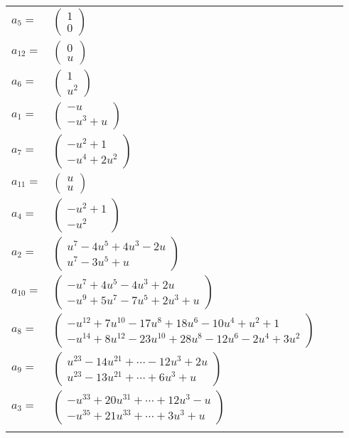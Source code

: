 \documentclass[1p]{elsarticle_modified}
\theoremstyle{definition}
\begin{document}
\begin{tabular}{m{7pt} m{180pt} m{7pt} m{180pt} }
\flushright $a_{5}=$&$\begin{pmatrix}1\\0\end{pmatrix}$ \\
\flushright $a_{12}=$&$\begin{pmatrix}0\\u\end{pmatrix}$ \\
\flushright $a_{6}=$&$\begin{pmatrix}1\\u^2\end{pmatrix}$ \\
\flushright $a_{1}=$&$\begin{pmatrix}- u\\- u^3+u\end{pmatrix}$ \\
\flushright $a_{7}=$&$\begin{pmatrix}- u^2+1\\- u^4+2 u^2\end{pmatrix}$ \\
\flushright $a_{11}=$&$\begin{pmatrix}u\\u\end{pmatrix}$ \\
\flushright $a_{4}=$&$\begin{pmatrix}- u^2+1\\- u^2\end{pmatrix}$ \\
\flushright $a_{2}=$&$\begin{pmatrix}u^7-4 u^5+4 u^3-2 u\\u^7-3 u^5+u\end{pmatrix}$ \\
\flushright $a_{10}=$&$\begin{pmatrix}- u^7+4 u^5-4 u^3+2 u\\- u^9+5 u^7-7 u^5+2 u^3+u\end{pmatrix}$ \\
\flushright $a_{8}=$&$\begin{pmatrix}- u^{12}+7 u^{10}-17 u^8+18 u^6-10 u^4+u^2+1\\- u^{14}+8 u^{12}-23 u^{10}+28 u^8-12 u^6-2 u^4+3 u^2\end{pmatrix}$ \\
\flushright $a_{9}=$&$\begin{pmatrix}u^{23}-14 u^{21}+\cdots-12 u^3+2 u\\u^{23}-13 u^{21}+\cdots+6 u^3+u\end{pmatrix}$ \\
\flushright $a_{3}=$&$\begin{pmatrix}- u^{33}+20 u^{31}+\cdots+12 u^3- u\\- u^{35}+21 u^{33}+\cdots+3 u^3+u\end{pmatrix}$\\&\end{tabular}
\end{document}
